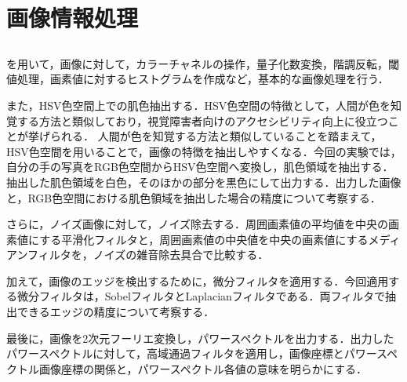 \chapter{画像情報処理}
\section{\purpose}
\matlab を用いて，画像に対して，カラーチャネルの操作，量子化数変換，階調反転，閾値処理，画素値に対するヒストグラムを作成など，基本的な画像処理を行う．\par
また，HSV色空間上での肌色抽出する．HSV色空間の特徴として，人間が色を知覚する方法と類似しており，視覚障害者向けのアクセシビリティ向上に役立つことが挙げられる\cite[p.97\ -\ p.98]{画像処理}．
人間が色を知覚する方法と類似していることを踏まえて，HSV色空間を用いることで，画像の特徴を抽出しやすくなる．今回の実験では，自分の手の写真をRGB色空間からHSV色空間へ変換し，肌色領域を抽出する．抽出した肌色領域を白色，そのほかの部分を黒色にして出力する．出力した画像と，RGB色空間における肌色領域を抽出した場合の精度について考察する．\par
さらに，ノイズ画像に対して，ノイズ除去する．周囲画素値の平均値を中央の画素値にする平滑化フィルタと，周囲画素値の中央値を中央の画素値にするメディアンフィルタを，ノイズの雑音除去具合で比較する．\par
加えて，画像のエッジを検出するために，微分フィルタを適用する．今回適用する微分フィルタは，SobelフィルタとLaplacianフィルタである．両フィルタで抽出できるエッジの精度について考察する．\par
最後に，画像を2次元フーリエ変換し，パワースペクトルを出力する．出力したパワースペクトルに対して，高域通過フィルタを適用し，画像座標とパワースペクトル画像座標の関係と，パワースペクトル各値の意味を明らかにする．